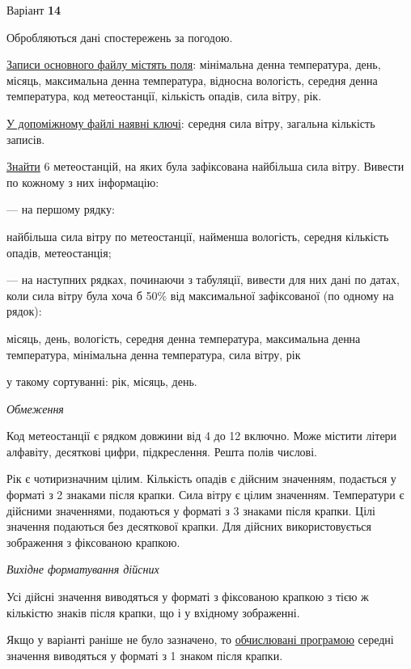 \documentclass[11pt, ukrainian]{article}
\begin{document}
\par
\newpage
{\center Варіант  \No \textbf { 14 }\par}
\bigskip
Обробляються дані спостережень за погодою. 

\underline{Записи основного файлу містять поля}: мінімальна денна температура, день, місяць, максимальна денна температура, відносна вологість, середня денна температура, код метеостанції, кількість опадів, сила вітру, рік.

\underline{У допоміжному файлі наявні ключі}: середня сила вітру, загальна кількість записів.

\underline{Знайти} 6 метеостанцій, на яких була зафіксована найбільша сила вітру. Вивести по кожному з них інформацію:\par
{\noindent}--- на першому рядку:\par
найбільша сила вітру по метеостанції, найменша вологість, середня кількість опадів, метеостанція;

{\noindent}--- на наступних рядках, починаючи з табуляції, вивести для них дані по датах, коли сила вітру була хоча б 50\% від максимальної зафіксованої (по одному на рядок):\par
місяць, день, вологість, середня денна температура, максимальна денна температура, мінімальна денна температура, сила вітру, рік

{\noindent}у такому сортуванні: рік, місяць, день.


\bigskip\textit{Обмеження}

Код метеостанції є рядком довжини від 4 до 12 включно.
Може містити літери алфавіту, десяткові цифри, підкреслення. Решта полів числові.

Рік є чотиризначним цілим.
Кількість опадів є дійсним значенням, подається у форматі з 2 знаками після крапки.
Сила вітру є цілим значенням.
Температури є дійсними значеннями, подаються у форматі з 3 знаками після крапки.
Цілі значення подаються без десяткової крапки.
Для дійсних використовується зображення з фіксованою крапкою.

\textit{Вихідне форматування дійсних}

Усі дійсні значення виводяться у форматі з фіксованою крапкою з тією ж кількістю знаків після крапки, що і у вхідному зображенні.

Якщо у варіанті раніше не було зазначено, то \underline{обчислювані програмою} середні значення виводяться у форматі з 1 знаком після крапки.
\end{document}
